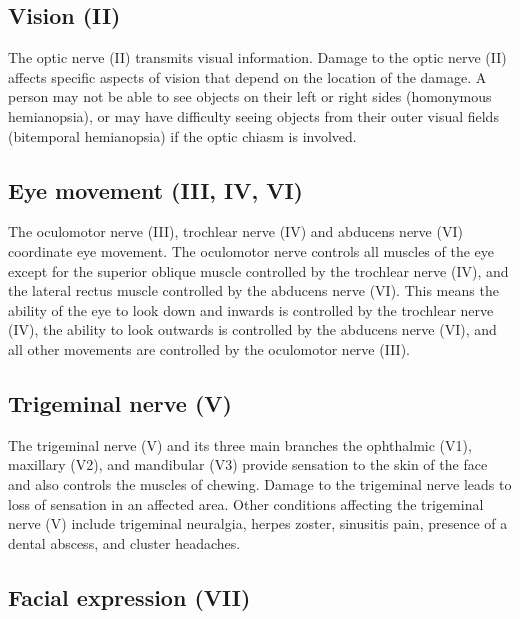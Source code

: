 \documentclass[]{book}
\begin{document}
\hypertarget{vision-ii}{%
\subsection{Vision (II)}\label{vision-ii}}

The optic nerve (II) transmits visual information. Damage to the optic nerve (II) affects specific aspects of vision that depend on the location of the damage. A person may not be able to see objects on their left or right sides (homonymous hemianopsia), or may have difficulty seeing objects from their outer visual fields (bitemporal hemianopsia) if the optic chiasm is involved.

\hypertarget{eye-movement-iii-iv-vi}{%
\subsection{Eye movement (III, IV, VI)}\label{eye-movement-iii-iv-vi}}

The oculomotor nerve (III), trochlear nerve (IV) and abducens nerve (VI) coordinate eye movement. The oculomotor nerve controls all muscles of the eye except for the superior oblique muscle controlled by the trochlear nerve (IV), and the lateral rectus muscle controlled by the abducens nerve (VI). This means the ability of the eye to look down and inwards is controlled by the trochlear nerve (IV), the ability to look outwards is controlled by the abducens nerve (VI), and all other movements are controlled by the oculomotor nerve (III).

\hypertarget{trigeminal-nerve-v}{%
\subsection{Trigeminal nerve (V)}\label{trigeminal-nerve-v}}

The trigeminal nerve (V) and its three main branches the ophthalmic (V1), maxillary (V2), and mandibular (V3) provide sensation to the skin of the face and also controls the muscles of chewing. Damage to the trigeminal nerve leads to loss of sensation in an affected area. Other conditions affecting the trigeminal nerve (V) include trigeminal neuralgia, herpes zoster, sinusitis pain, presence of a dental abscess, and cluster headaches.

\hypertarget{facial-expression-vii}{%
\subsection{Facial expression (VII)}\label{facial-expression-vii}}
\end{document}
